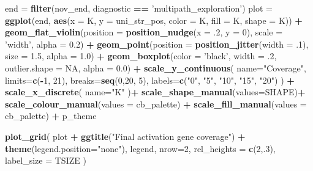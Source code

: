 \documentclass[]{book}
\newenvironment{Shaded}{\begin{snugshade}}{\end{snugshade}}
\newcommand{\DataTypeTok}[1]{\textcolor[rgb]{0.13,0.29,0.53}{#1}}
\newcommand{\DecValTok}[1]{\textcolor[rgb]{0.00,0.00,0.81}{#1}}
\newcommand{\FloatTok}[1]{\textcolor[rgb]{0.00,0.00,0.81}{#1}}
\newcommand{\KeywordTok}[1]{\textcolor[rgb]{0.13,0.29,0.53}{\textbf{#1}}}
\newcommand{\NormalTok}[1]{#1}
\newcommand{\OperatorTok}[1]{\textcolor[rgb]{0.81,0.36,0.00}{\textbf{#1}}}
\newcommand{\OtherTok}[1]{\textcolor[rgb]{0.56,0.35,0.01}{#1}}
\newcommand{\StringTok}[1]{\textcolor[rgb]{0.31,0.60,0.02}{#1}}
\begin{document}
\begin{Shaded}
\begin{Highlighting}[]
\NormalTok{end =}\StringTok{ }\KeywordTok{filter}\NormalTok{(nov_end, diagnostic }\OperatorTok{==}\StringTok{ 'multipath_exploration'}\NormalTok{)}
\NormalTok{plot =}\StringTok{ }\KeywordTok{ggplot}\NormalTok{(end, }\KeywordTok{aes}\NormalTok{(}\DataTypeTok{x =}\NormalTok{ K, }\DataTypeTok{y =}\NormalTok{ uni_str_pos, }\DataTypeTok{color =}\NormalTok{ K, }\DataTypeTok{fill =}\NormalTok{ K, }\DataTypeTok{shape =}\NormalTok{ K)) }\OperatorTok{+}
\StringTok{  }\KeywordTok{geom_flat_violin}\NormalTok{(}\DataTypeTok{position =} \KeywordTok{position_nudge}\NormalTok{(}\DataTypeTok{x =} \FloatTok{.2}\NormalTok{, }\DataTypeTok{y =} \DecValTok{0}\NormalTok{), }\DataTypeTok{scale =} \StringTok{'width'}\NormalTok{, }\DataTypeTok{alpha =} \FloatTok{0.2}\NormalTok{) }\OperatorTok{+}
\StringTok{  }\KeywordTok{geom_point}\NormalTok{(}\DataTypeTok{position =} \KeywordTok{position_jitter}\NormalTok{(}\DataTypeTok{width =} \FloatTok{.1}\NormalTok{), }\DataTypeTok{size =} \FloatTok{1.5}\NormalTok{, }\DataTypeTok{alpha =} \FloatTok{1.0}\NormalTok{) }\OperatorTok{+}
\StringTok{  }\KeywordTok{geom_boxplot}\NormalTok{(}\DataTypeTok{color =} \StringTok{'black'}\NormalTok{, }\DataTypeTok{width =} \FloatTok{.2}\NormalTok{, }\DataTypeTok{outlier.shape =} \OtherTok{NA}\NormalTok{, }\DataTypeTok{alpha =} \FloatTok{0.0}\NormalTok{) }\OperatorTok{+}
\StringTok{  }\KeywordTok{scale_y_continuous}\NormalTok{(}
    \DataTypeTok{name=}\StringTok{"Coverage"}\NormalTok{,}
    \DataTypeTok{limits=}\KeywordTok{c}\NormalTok{(}\OperatorTok{-}\DecValTok{1}\NormalTok{, }\DecValTok{21}\NormalTok{),}
    \DataTypeTok{breaks=}\KeywordTok{seq}\NormalTok{(}\DecValTok{0}\NormalTok{,}\DecValTok{20}\NormalTok{, }\DecValTok{5}\NormalTok{),}
    \DataTypeTok{labels=}\KeywordTok{c}\NormalTok{(}\StringTok{"0"}\NormalTok{, }\StringTok{"5"}\NormalTok{, }\StringTok{"10"}\NormalTok{, }\StringTok{"15"}\NormalTok{, }\StringTok{"20"}\NormalTok{)}
\NormalTok{  ) }\OperatorTok{+}
\StringTok{  }\KeywordTok{scale_x_discrete}\NormalTok{(}
    \DataTypeTok{name=}\StringTok{"K"}
\NormalTok{  )}\OperatorTok{+}
\StringTok{  }\KeywordTok{scale_shape_manual}\NormalTok{(}\DataTypeTok{values=}\NormalTok{SHAPE)}\OperatorTok{+}
\StringTok{  }\KeywordTok{scale_colour_manual}\NormalTok{(}\DataTypeTok{values =}\NormalTok{ cb_palette) }\OperatorTok{+}
\StringTok{  }\KeywordTok{scale_fill_manual}\NormalTok{(}\DataTypeTok{values =}\NormalTok{ cb_palette) }\OperatorTok{+}
\StringTok{  }\NormalTok{p_theme}

\KeywordTok{plot_grid}\NormalTok{(}
\NormalTok{  plot }\OperatorTok{+}
\StringTok{    }\KeywordTok{ggtitle}\NormalTok{(}\StringTok{"Final activation gene coverage"}\NormalTok{) }\OperatorTok{+}
\StringTok{    }\KeywordTok{theme}\NormalTok{(}\DataTypeTok{legend.position=}\StringTok{"none"}\NormalTok{),}
\NormalTok{  legend,}
  \DataTypeTok{nrow=}\DecValTok{2}\NormalTok{,}
  \DataTypeTok{rel_heights =} \KeywordTok{c}\NormalTok{(}\DecValTok{2}\NormalTok{,.}\DecValTok{3}\NormalTok{),}
  \DataTypeTok{label_size =}\NormalTok{ TSIZE}
\NormalTok{)}
\end{Highlighting}
\end{Shaded}
\end{document}
